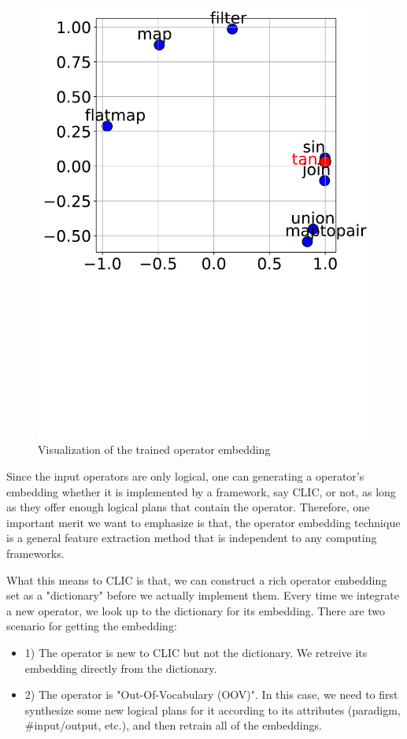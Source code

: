\begin{figure}[tbh]
  \centering
  \includegraphics[width=0.8\linewidth]{figures/embedding_visual.pdf}
  \caption{Visualization of the trained operator embedding}
  \label{fig:emb_visual}
\end{figure}

Since the input operators are only logical, 
one can generating a operator's embedding whether it is implemented by a framework, say CLIC, or not, 
as long as they offer enough logical plans that contain the operator.
Therefore, one important merit we want to emphasize is that, the operator embedding technique is a general feature extraction method that is independent to any computing frameworks.

What this means to CLIC is that, we can construct a rich operator embedding set as a "dictionary" before we actually implement them.
Every time we integrate a new operator, we look up to the dictionary for its embedding. There are two scenario for getting the embedding:
\begin{itemize}
    \item 1) The operator is new to CLIC but not the dictionary. We retreive its embedding directly from the dictionary.
    \item 2) The operator is "Out-Of-Vocabulary (OOV)". In this case, we need to first synthesize some new logical plans for it according to its attributes (paradigm, \#input/output, etc.), and then retrain all of the embeddings.
\end{itemize}



